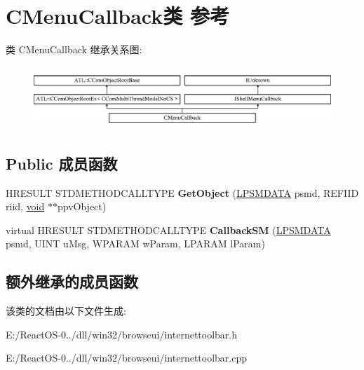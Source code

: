 \hypertarget{class_c_menu_callback}{}\section{C\+Menu\+Callback类 参考}
\label{class_c_menu_callback}
类 C\+Menu\+Callback 继承关系图\+:\begin{figure}[H]
\begin{center}
\leavevmode
\includegraphics[height=2.386364cm]{class_c_menu_callback}
\end{center}
\end{figure}
\subsection*{Public 成员函数}
\begin{DoxyCompactItemize}
\item 
\mbox{\label{class_c_menu_callback_a7bddc80a860b82b733629ee6ccd9b193}} 
H\+R\+E\+S\+U\+LT S\+T\+D\+M\+E\+T\+H\+O\+D\+C\+A\+L\+L\+T\+Y\+PE {\bfseries Get\+Object} (\hyperlink{structtag_s_m_d_a_t_a}{L\+P\+S\+M\+D\+A\+TA} psmd, R\+E\+F\+I\+ID riid, \hyperlink{interfacevoid}{void} $\ast$$\ast$ppv\+Object)
\item 
\mbox{\label{class_c_menu_callback_a1076065b5ec69a0e39e664425cb54312}} 
virtual H\+R\+E\+S\+U\+LT S\+T\+D\+M\+E\+T\+H\+O\+D\+C\+A\+L\+L\+T\+Y\+PE {\bfseries Callback\+SM} (\hyperlink{structtag_s_m_d_a_t_a}{L\+P\+S\+M\+D\+A\+TA} psmd, U\+I\+NT u\+Msg, W\+P\+A\+R\+AM w\+Param, L\+P\+A\+R\+AM l\+Param)
\end{DoxyCompactItemize}
\subsection*{额外继承的成员函数}


该类的文档由以下文件生成\+:\begin{DoxyCompactItemize}
\item 
E\+:/\+React\+O\+S-\/0../dll/win32/browseui/internettoolbar.\+h\item 
E\+:/\+React\+O\+S-\/0../dll/win32/browseui/internettoolbar.\+cpp\end{DoxyCompactItemize}
